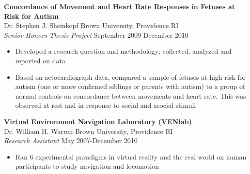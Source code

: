 \documentclass[line,margin,10pt]{res}
\begin{document}
\begin{resume}
	\textbf{Concordance of Movement and Heart Rate Responses in Fetuses at Risk for Autism}\\
Dr. Stephen J. Sheinkopf \hfill Brown University, Providence RI \\
{\sl Senior Honors Thesis Project} \hfill September 2009-December 2010
\begin{itemize}\itemsep-2pt
\item Developed a research question and methodology; collected, analyzed and reported on data
\item Based on actocardiograph data, compared a sample of fetuses at high risk for autism (one or more confirmed siblings or parents with autism) to a group of normal controls on concordance between movements and heart rate.  This was observed at rest and in response to social and asocial stimuli
 \end{itemize}

\textbf{Virtual Environment Navigation Laboratory (VENlab)}\\
Dr. William H. Warren \hfill Brown University, Providence RI\\
	{\sl Research Assistant} \hfill May 2007-December 2010
	\begin{itemize} \itemsep -2pt
	\item Ran 6 experimental paradigms in virtual reality and the real world on human participants to study navigation and locomotion
\end{itemize}



\end{resume}
\end{document}
